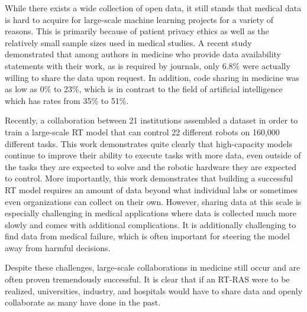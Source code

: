 \documentclass[fleqn,10pt]{wlscirep}\twocolumn
\begin{document}
While there exists a wide collection of open data, it still stands that medical data is hard to acquire for large-scale machine learning projects for a variety of reasons\cite{kim2019medical}. 
This is primarily because of patient privacy ethics as well as the relatively small sample sizes used in medical studies.
A recent study demonstrated that among authors in medicine who provide data availability statements with their work, as is required by journals, only 6.8\% were actually willing to share the data upon request\cite{gabelica2022many}.
In addition, code sharing in medicine was as low as 0\% to 23\%\cite{hamilton2023prevalence}, which is in contrast to the field of artificial intelligence which has rates from 35\% to 51\%\cite{lin2022automatic}.

Recently, a collaboration between 21 institutions assembled a dataset in order to train a large-scale RT model that can control 22 different robots\cite{open_x_embodiment_rt_x_2023} on 160,000 different tasks.
This work demonstrates quite clearly that high-capacity models continue to improve their ability to execute tasks with more data, even outside of the tasks they are expected to solve and the robotic hardware they are expected to control.
More importantly, this work demonstrates that building a successful RT model requires an amount of data beyond what individual labs or sometimes even organizations can collect on their own.
However, sharing data at this scale is especially challenging in medical applications where data is collected much more slowly and comes with additional complications.
It is additionally challenging to find data from medical failure, which is often important for steering the model away from harmful decisions.

Despite these challenges, large-scale collaborations in medicine still occur and are often proven tremendously successful\cite{rives2021biological, jumper2021highly, wu2023towards, wang2023medfmc}.
It is clear that if an RT-RAS were to be realized, universities, industry, and hospitals would have to share data and openly collaborate as many have done in the past.










 
\end{document}
